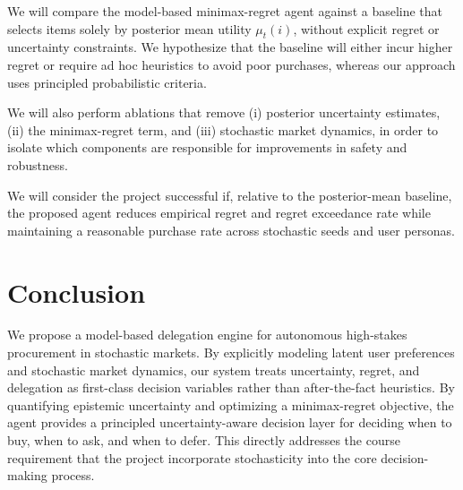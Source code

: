 \documentclass[11pt]{article}
\begin{document}
We will compare the model-based minimax-regret agent against a baseline that selects items solely by posterior mean utility $\mu_t(i)$, without explicit regret or uncertainty constraints. We hypothesize that the baseline will either incur higher regret or require ad hoc heuristics to avoid poor purchases, whereas our approach uses principled probabilistic criteria.

We will also perform ablations that remove (i) posterior uncertainty estimates, (ii) the minimax-regret term, and (iii) stochastic market dynamics, in order to isolate which components are responsible for improvements in safety and robustness.

We will consider the project successful if, relative to the posterior-mean baseline, the proposed agent reduces empirical regret and regret exceedance rate while maintaining a reasonable purchase rate across stochastic seeds and user personas.

\section{Conclusion}

We propose a model-based delegation engine for autonomous high-stakes procurement in stochastic markets. By explicitly modeling latent user preferences and stochastic market dynamics, our system treats uncertainty, regret, and delegation as first-class decision variables rather than after-the-fact heuristics. By quantifying epistemic uncertainty and optimizing a minimax-regret objective, the agent provides a principled uncertainty-aware decision layer for deciding when to buy, when to ask, and when to defer.\cite{charpentier2022disentangling,rigter2020minimax} This directly addresses the course requirement that the project incorporate stochasticity into the core decision-making process.
\end{document}

